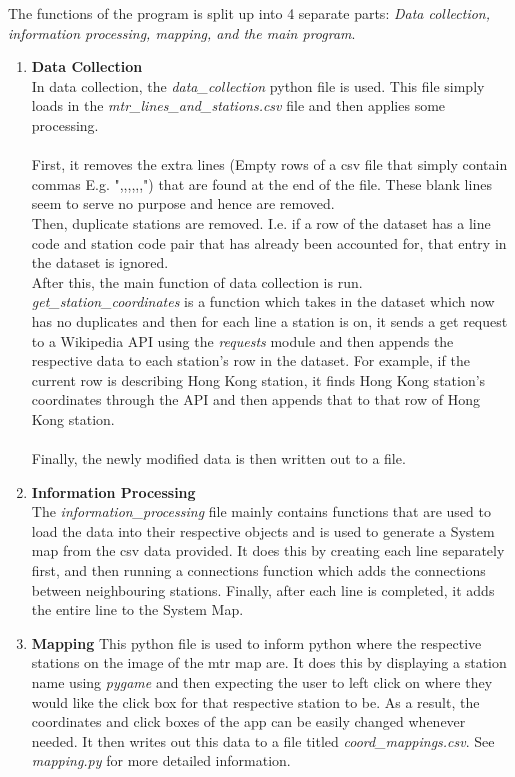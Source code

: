 \documentclass[fontsize=11pt]{article}
\begin{document}
The functions of the program is split up into 4 separate parts: \textit{Data collection, information processing, mapping, and the main program}. 
\begin{enumerate}
    \item \textbf{Data Collection}\\
    In data collection, the \textit{data\_collection} python file is used. This file simply loads in the \textit{mtr\_lines\_and\_stations.csv} file and then applies some processing.\\\\
    First, it removes the extra lines (Empty rows of a csv file that simply contain commas E.g. ",,,,,,") that are found at the end of the file. These blank lines seem to serve no purpose and hence are removed.\\
    Then, duplicate stations are removed. I.e. if a row of the dataset has a line code and station code pair that has already been accounted for, that entry in the dataset is ignored. \\
    After this, the main function of data collection is run. \textit{get\_station\_coordinates} is a function which takes in the dataset which now has no duplicates and then for each line a station is on, it sends a get request to a Wikipedia API using the \textit{requests} module and then appends the respective data to each station's row in the dataset. For example, if the current row is describing Hong Kong station, it finds Hong Kong station's coordinates through the API and then appends that to that row of Hong Kong station. \\\\
    Finally, the newly modified data is then written out to a file.
    \item \textbf{Information Processing}\\
    The \textit{information\_processing} file mainly contains functions that are used to load the data into their respective objects and is used to generate a System map from the csv data provided. 
    It does this by creating each line separately first, and then running a connections function which adds the connections between neighbouring stations. Finally, after each line is completed, it adds the entire line to the System Map. 
    \item \textbf{Mapping}
    This python file is used to inform python where the respective stations on the image of the mtr map are. It does this by displaying a station name using \textit{pygame} and then expecting the user to left click on where they would like the click box for that respective station to be. As a result, the coordinates and click boxes of the app can be easily changed whenever needed. It then writes out this data to a file titled \textit{coord\_mappings.csv}. See \textit{mapping.py} for more detailed information.

\end{enumerate}
\end{document}
